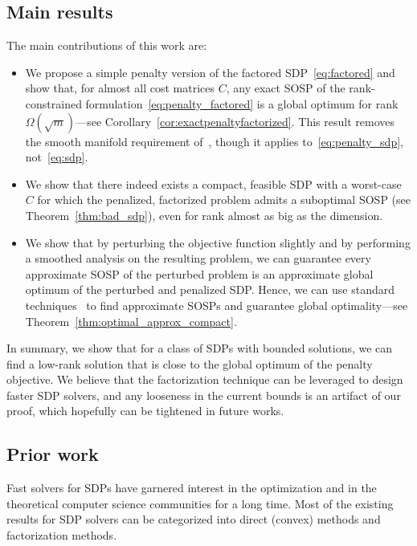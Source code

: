 \subsection{Main results}
The main contributions of this work are: 
\begin{itemize}
	\item We propose a simple penalty version of the factored SDP~\eqref{eq:factored} and show that, for almost all cost matrices $C$, any exact SOSP of the rank-constrained formulation~\eqref{eq:penalty_factored} is a global optimum for rank ${\Omega}(\sqrt{m})$---see Corollary~\ref{cor:exactpenaltyfactorized}. This result removes the smooth manifold requirement of~\citep{boumal2016non}, though it applies to~\eqref{eq:penalty_sdp}, not~\eqref{eq:sdp}.
	\item We show that there indeed exists a compact, feasible SDP with a worst-case $C$ for which the penalized, factorized problem admits a suboptimal SOSP (see Theorem~\ref{thm:bad_sdp}), even for rank almost as big as the dimension.
	\item We show that by perturbing the objective function slightly and by performing a smoothed analysis on the resulting problem, we can guarantee every approximate SOSP of the perturbed problem is an approximate global optimum of the perturbed and penalized SDP. Hence, we can use standard techniques~\citep{cartis2012complexity,ge2015escaping} to find approximate SOSPs and guarantee global optimality---see Theorem~\ref{thm:optimal_approx_compact}.
\end{itemize}

In summary, we show that for a class of SDPs with bounded solutions, we can find a low-rank solution that is close to the global optimum of the penalty objective. We believe that the factorization technique can be leveraged to design faster SDP solvers, and any looseness in the current bounds is an artifact of our proof, which hopefully can be tightened in future works. 

\subsection{Prior work}

Fast solvers for SDPs have garnered interest in the optimization and in the theoretical computer science communities for a long time. Most of the existing results for SDP solvers can be categorized into direct (convex) methods and factorization methods. \\

